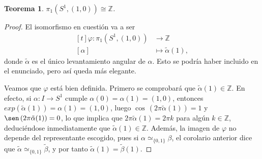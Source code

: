 \documentclass[11pt]{report}
\newenvironment{ctheorem} %
  {\begin{mdframed}[innertopmargin = 0pt,
                    innerbottommargin = 7.5pt,
                    backgroundcolor = lightgray!10,
                    linewidth = 1pt,
                    shadow = true,
                    shadowsize = 5pt,
                    roundcorner = 0pt,
                    skipabove = 0pt]
    \begin{theorem}}
  {\end{theorem}\end{mdframed}}
\newtheorem{theorem}{Teorema}[chapter]
\theoremstyle{definition}
\theoremstyle{definition}
\theoremstyle{remark}
\newcommand{\Z}{\mathbb Z}
\begin{document}
\begin{ctheorem}
$\pi_1(S^1,(1,0)) \cong \Z$.
\end{ctheorem}

\begin{proof}
El isomorfismo en cuestión va a ser
\[
\begin{aligned}[t]
\varphi \colon \pi_1(S^1,(1,0)) &\longrightarrow \Z \\
[\alpha] &\longmapsto \tilde{\alpha}(1),
\end{aligned}
\]
donde $\tilde{\alpha}$ es el único levantamiento angular de $\alpha$. Esto se podría haber incluido en el enunciado, pero así queda más elegante.

\vspace{2mm}

Veamos que $\varphi$ está bien definida. Primero se comprobará que $\tilde{\alpha}(1) \in \Z$. En efecto, si $\alpha \colon I \to S^1$ cumple $\alpha(0)=\alpha(1)=(1,0)$, entonces $exp(\tilde{\alpha}(1)) = \alpha(1) = (1,0)$, luego $\cos \, (2\pi \tilde{\alpha}(1)) = 1$ y $ \sen \, (2\pi \tilde{\alpha}(1)) = 0$, lo que implica que $2\pi \tilde{\alpha}(1) = 2\pi k$ para algún $k \in \Z$, deduciéndose inmediatamente que $\tilde{\alpha}(1) \in \Z$. Además, la imagen de $\varphi$ no depende del representante escogido, pues si $\alpha \simeq_{\{0,1\}} \beta$, el corolario anterior dice que $\tilde{\alpha} \simeq_{\{0,1\}} \tilde{\beta}$, y por tanto $\tilde{\alpha}(1) = \tilde{\beta}(1)$.

\vspace{2mm}


\end{proof}
\end{document}
